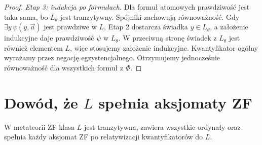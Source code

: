 \begin{proof}
\emph{Etap 3: indukcja po formułach.}
Dla formuł atomowych prawdziwość jest taka sama,
bo $L_\theta$ jest tranzytywny. Spójniki zachowują
równoważność. Gdy $\exists y\,\psi(y,\vec a)$ jest
prawdziwe w $L$, Etap 2 dostarcza świadka
$y\in L_\theta$, a założenie indukcyjne daje
prawdziwość $\psi$ w $L_\theta$.
W przeciwną stronę świadek z $L_\theta$ jest
również elementem $L$, więc stosujemy
założenie indukcyjne. Kwantyfikator ogólny
wyrażamy przez negację egzystencjalnego.
Otrzymujemy jednocześnie równoważność dla wszystkich
formuł z $\Phi$.
\end{proof}

\section{Dowód, że \texorpdfstring{$L$}{L} spełnia aksjomaty ZF}
\label{sec:l-model-zf}
\begin{twierdzenie}
\label{thm:l-model-zf}
W metateorii ZF klasa $L$ jest tranzytywna, zawiera
wszystkie ordynały oraz spełnia każdy aksjomat ZF
po relatywizacji kwantyfikatorów do $L$.
\end{twierdzenie}
